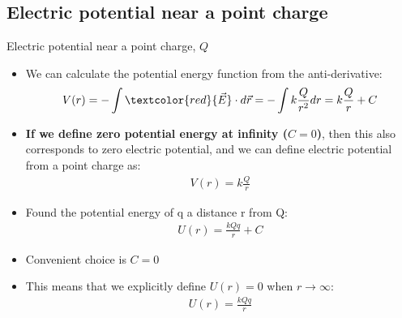 \documentclass[aspectratio=169,
hyperref={colorlinks,urlcolor=blue}
]{beamer}
\begin{document}
\subsection{Electric potential near a point charge}
\label{subsec:electricpotentialnearapointcharge}
\begin{frame}{Electric potential near a point charge, $Q$}

\begin{itemize}
\item We can calculate the potential energy function from the anti-derivative:
\begin{align*}
V(r) &= -\int \textcolor{red}{\vec E}\cdot d\vec r = -\int k\frac{Q}{r^2}dr = k\frac{Q}{r}+C\\
\end{align*}
\item \textbf{If we define zero potential energy at infinity ($C = 0$)}, then this also corresponds to zero electric potential, and we can define electric potential from a point charge as:
\begin{align*}
 V(r) =k\frac{Q}{r}
\end{align*}
\end{itemize}
\end{frame}
{
\begin{itemize}
\item Found the potential energy of q a distance r from Q:\\
\begin{align*}
U(r) = \frac{kQq}{r}+C
\end{align*}
\item Convenient choice is $C=0$
\item This means that we explicitly define $U(r)=0$ when $r\to\infty$:
\begin{align*}
\boxed{U(r) = \frac{kQq}{r}}
\end{align*}

\end{itemize}
}
{
\begin{center}
\end{center}
}
\end{document}
